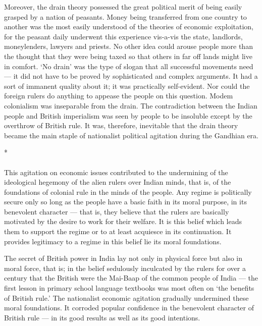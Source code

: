 \begin{multicols}{2}
Moreover, the drain theory possessed the great political merit of being easily grasped by a nation of peasants. Money being transferred from one country to another was the most easily understood of the theories of economic exploitation, for the peasant daily underwent this experience vis-a-vis the state, landlords, moneylenders, lawyers and priests. No other idea could arouse people more than the thought that they were being taxed so that others in far off lands might live in comfort. `No drain' was the type of slogan that all successful movements need --- it did not have to be proved by sophisticated and complex arguments. It had a sort of immanent quality about it; it was practically self-evident. Nor could the foreign rulers do anything to appease the people on this question. Modem colonialism was inseparable from the drain. The contradiction between the Indian people and British imperialism was seen by people to be insoluble except by the overthrow of British rule. It was, therefore, inevitable that the drain theory became the main staple of nationalist political agitation during the Gandhian era.

\begin{center}*\end{center}

\paragraph*{}

This agitation on economic issues contributed to the undermining of the ideological hegemony of the alien rulers over Indian minds, that is, of the foundations of colonial rule in the minds of the people. Any regime is politically secure only so long as the people have a basic faith in its moral purpose, in its benevolent character --- that is, they believe that the rulers are basically motivated by the desire to work for their welfare. It is this belief which leads them to support the regime or to at least acquiesce in its continuation. It provides legitimacy to a regime in this belief lie its moral foundations.

The secret of British power in India lay not only in physical force but also in moral force, that is; in the belief sedulously inculcated by the rulers for over a century that the British were the Mai-Baap of the common people of India --- the first lesson in primary school language textbooks was most often on `the benefits of British rule.' The nationalist economic agitation gradually undermined these moral foundations. It corroded popular confidence in the benevolent character of British rule --- in its good results as well as its good intentions.


\end{multicols}
